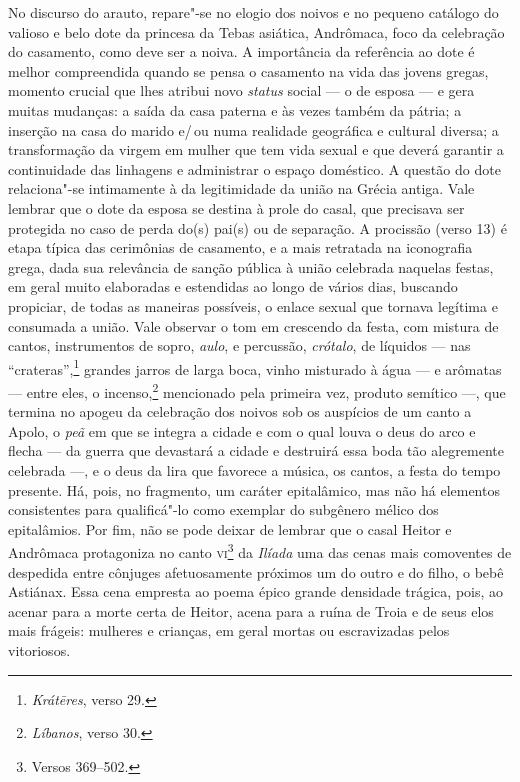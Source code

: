 No discurso do arauto, repare"-se no
elogio dos noivos e no pequeno catálogo do valioso e belo dote da princesa da
Tebas asiática, Andrômaca, foco da celebração do casamento, como deve ser a noiva.
A importância da
referência ao dote é melhor
compreendida quando se pensa o casamento na vida das jovens gregas, momento
crucial que lhes atribui novo \emph{status} social --- o de esposa --- e gera
muitas mudanças: a saída da casa paterna e às vezes também da pátria; a
inserção na casa do marido e/\,ou numa realidade geográfica e cultural diversa; a
transformação da virgem em mulher que tem vida sexual e que deverá garantir a
continuidade das linhagens e administrar o espaço doméstico. A questão do dote
relaciona"-se intimamente à da legitimidade da união na Grécia antiga. Vale
lembrar que o dote da esposa se destina à prole do casal, que precisava ser
protegida no caso de perda do(s) pai(s) ou de separação. A procissão (verso
13) é etapa típica das cerimônias de casamento, e a mais retratada na iconografia grega, dada sua relevância de sanção pública à união celebrada naquelas festas, em geral muito elaboradas e
estendidas ao longo de vários dias, buscando propiciar, de todas as maneiras
possíveis, o enlace sexual que tornava legítima e consumada a união.
Vale observar o tom em crescendo da festa, com mistura de cantos, instrumentos de sopro, \emph{aulo}, e percussão, \emph{crótalo}, de líquidos --- nas ``crateras'',\footnote{\emph{Krátēres}, verso 29.} grandes jarros de larga boca, vinho misturado à água --- e arômatas  --- entre eles, o incenso,\footnote{\emph{Líbanos}, verso 30.} mencionado pela primeira vez, produto semítico ---, que termina no apogeu da celebração dos noivos sob os auspícios de um canto a Apolo, o \emph{peã} em que se integra a cidade e com o qual louva o deus do arco e flecha --- da guerra que devastará a cidade e destruirá essa boda tão alegremente celebrada ---, e o deus da lira que favorece a música, os cantos, a festa do tempo presente. 
Há, pois, no fragmento, um caráter epitalâmico, mas não há elementos consistentes para
qualificá"-lo como exemplar do subgênero mélico dos epitalâmios. Por fim, não se
pode deixar de lembrar que o casal Heitor e Andrômaca protagoniza no canto \textsc{vi}\footnote{Versos 369--502.} 
da \emph{Ilíada} uma das cenas mais comoventes de despedida
entre cônjuges afetuosamente próximos um do outro e do filho, o bebê Astiánax.
Essa cena empresta ao poema épico grande densidade trágica, pois, ao acenar
para a morte certa de Heitor, acena para a ruína de Troia e de seus elos mais
frágeis: mulheres e crianças, em geral mortas ou escravizadas pelos vitoriosos.
